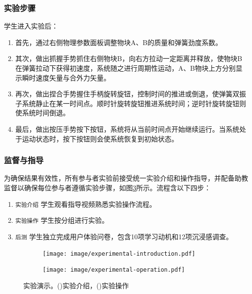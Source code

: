 \documentclass[runningheads]{llncs}
\begin{document}
\subsubsection{实验步骤}
学生进入实验后：

\begin{enumerate}[label=$\bullet$]
  \item 首先，通过右侧物理参数面板调整物块A、B的质量和弹簧劲度系数。
  \item 其次，做出抓握手势抓住右侧物块B，向右方拉动一定距离并释放，使物块B在弹簧拉动下获得初速度，系统随之进行周期性运动，A、B物块上方分别显示瞬时速度矢量与合外力矢量。
  \item 再次，做出捏合手势握住手柄旋转旋钮，控制时间的推进或倒退，使弹簧双振子系统静止在某一时间点。顺时针旋转旋钮推进系统时间；逆时针旋转旋钮则使系统时间倒退。
  \item 最后，做出按压手势按下按钮，系统将从当前时间点开始继续运行。当系统处于运动状态时，按下按钮则会使系统恢复到初始状态。
\end{enumerate}

\subsubsection{监督与指导}
为确保结果有效性，所有参与者实验前接受统一实验介绍和操作指导，并配备助教监督以确保每位参与者遵循实验步骤，如图\ref{fig:experimental-procedure}所示。流程含以下四步：

\begin{enumerate}[label={\arabic*)}]
\item \texttt{实验介绍} 学生观看指导视频熟悉实验操作流程。
\item \texttt{实验操作} 学生按分组进行实验。
\item \texttt{后测} 学生独立完成用户体验问卷，包含10项学习动机和12项沉浸感调查。
\end{enumerate}

\begin{figure}
  \begin{subfigure}{0.48\linewidth}
    \centering
    \texttt{[image: image/experimental-introduction.pdf]}
    \caption{}
    \label{fig:experimental-introduction}
  \end{subfigure}
  \hfill
  \begin{subfigure}{0.48\linewidth}
    \centering
    \texttt{[image: image/experimental-operation.pdf]}
    \caption{}
    \label{fig:experimental-operation}
  \end{subfigure}
  \caption{实验演示。()实验介绍，()实验操作}
  \label{fig:experimental-procedure}
\end{figure}
\end{document}
